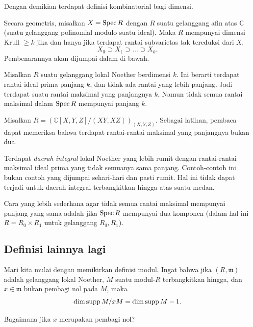 Dengan demikian terdapat definisi kombinatorial bagi dimensi.

Secara geometris, misalkan $X = \operatorname{Spec} R$ dengan $R$ suatu gelanggang afin atas $\mathbb{C}$ (suatu
gelanggang polinomial modulo suatu ideal). Maka $R$ mempunyai dimensi Krull $\geq k$ jika dan hanya jika terdapat
rantai subvarietas tak tereduksi dari $X$,
\[ X_0 \supset X_1 \supset \dots \supset X_k . \]
Pembenarannya akan dijumpai dalam  di bawah.

\begin{remark} Misalkan $R$ suatu gelanggang lokal Noether berdimensi $k$. Ini
berarti terdapat rantai ideal prima panjang $k$, dan tidak ada rantai yang lebih
panjang. Jadi terdapat suatu rantai maksimal yang panjangnya $k$. Namun tidak semua
rantai maksimal dalam $\operatorname{Spec} R$ mempunyai panjang $k$. 
\end{remark} 

\begin{example} 
Misalkan $R =( \mathbb{C}[X,Y,Z]/(XY,XZ))_{(X,Y,Z)}$. Sebagai
latihan, pembaca dapat memeriksa bahwa terdapat rantai-rantai maksimal yang
panjangnya bukan dua.

Terdapat \emph{daerah integral} lokal Noether yang lebih rumit dengan rantai-rantai maksimal
ideal prima yang tidak semuanya sama panjang. Contoh-contoh ini bukan contoh yang
dijumpai sehari-hari dan pasti rumit. Hal ini
tidak dapat terjadi untuk daerah integral terbangkitkan hingga atas suatu medan.
\end{example} 

\begin{example} 
Cara yang lebih sederhana agar tidak semua rantai maksimal mempunyai panjang yang sama adalah jika
$\operatorname{Spec} R$ mempunyai dua komponen (dalam hal ini $R = R_0 \times R_1$ untuk gelanggang
$R_0, R_1$). 
\end{example} 


\subsection{Definisi lainnya lagi}
Mari kita mulai dengan memikirkan definisi modul. Ingat bahwa jika $(R,
\mathfrak{m})$ adalah
gelanggang lokal Noether, $M$ suatu modul-$R$ terbangkitkan hingga, dan $x \in \mathfrak{m}$
bukan pembagi nol pada $M$, maka
\[ \mathrm{dim} \operatorname{supp} M/xM = \mathrm{dim} \operatorname{supp} M -1.  \]

\begin{question} 
Bagaimana jika $x$ merupakan pembagi nol? 
\end{question} 

